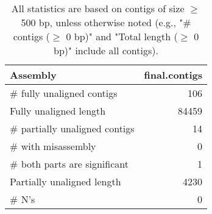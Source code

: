 \documentclass[12pt,a4paper]{article}
\begin{document}
\begin{table}[ht]
\begin{center}
\caption{All statistics are based on contigs of size $\geq$ 500 bp, unless otherwise noted (e.g., "\# contigs ($\geq$ 0 bp)" and "Total length ($\geq$ 0 bp)" include all contigs).}
\begin{tabular}{|l*{1}{|r}|}
\hline
Assembly & final.contigs \\ \hline
\# fully unaligned contigs & 106 \\ \hline
Fully unaligned length & 84459 \\ \hline
\# partially unaligned contigs & 14 \\ \hline
\hspace{5mm}\# with misassembly & 0 \\ \hline
\hspace{5mm}\# both parts are significant & 1 \\ \hline
Partially unaligned length & 4230 \\ \hline
\# N's & 0 \\ \hline
\end{tabular}
\end{center}
\end{table}
\end{document}
